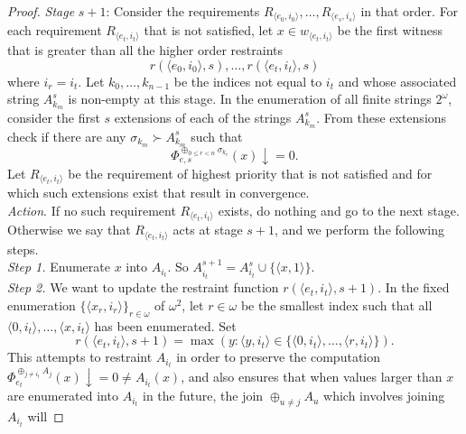 \documentclass{article}
\begin{document}
\begin{enumerate}[label={(\roman*)}]
\begin{proof}
        \textit{Stage} $s+1$: Consider the requirements $R_{\langle
        e_0,i_0\rangle}, \ldots, R_{\langle e_s,i_s\rangle}$ in that order.
        For each requirement $R_{\langle e_t,i_t\rangle}$ that is not
        satisfied, let $x\in w_{\langle e_t,i_t\rangle}$ be the first
        witness that is greater than all the higher order restraints
        \[r(\langle e_0,i_0\rangle,s), \ldots, r(\langle
        e_{t},i_{t}\rangle,s)\] where $i_r=i_t$. Let $k_0,\ldots,k_{n-1}$
        be the indices not equal to $i_t$ and whose associated string
        $A_{k_m}^s$ is non-empty at this stage. In the enumeration of all
        finite strings $2^{\omega}$, consider the first $s$ extensions of
        each of the strings $A_{k_m}^s$. From these extensions check if
        there are any $\sigma_{k_m}\succ A_{k_m}^s$ such that
        \[\Phi_{e,s}^{\oplus_{0\leq r<n}\sigma_{k_r}}(x) \downarrow=0.\]
        Let $R_{\langle e_t,i_t\rangle}$ be the requirement of highest
        priority that is not satisfied and for which such extensions exist
        that result in convergence. \\

        \textit{Action}. If no such requirement $R_{\langle
        e_t,i_t\rangle}$ exists, do nothing and go to the next stage.
        Otherwise we say that $R_{\langle e_t,i_t\rangle}$ acts at stage
        $s+1$, and we perform the following steps. \\

        \textit{Step 1.} Enumerate $x$ into $A_{i_t}$. So
        $A_{i_t}^{s+1}=A_{i_t}^s\cup\{\langle x,1\rangle\}$. \\

        \textit{Step 2.} We want to update the restraint function
        $r(\langle e_t,i_t\rangle,s+1)$. In the fixed enumeration
        $\{\langle x_r,i_r\rangle\}_{r\in\omega}$ of $\omega^2$, let
        $r\in\omega$ be the smallest index such that all $\langle
        0,i_t\rangle, \ldots, \langle x,i_t\rangle$ has been enumerated.
        Set
        \[r(\langle e_t,i_t\rangle,s+1) =\max(y: \langle y,i_t\rangle
        \in\{\langle 0,i_t\rangle, \ldots, \langle r,i_t\rangle\}).\]
        This attempts to restraint $A_{i_t}$ in order to preserve the
        computation $\Phi^{\oplus_{j\neq i_t}A_j}_{e_t}(x) \downarrow
        =0\neq A_{i_t}(x)$, and also ensures that when values larger than
        $x$ are enumerated into $A_{i_t}$ in the future, the join 
        $\oplus_{u\neq j}A_u$ which involves joining $A_{i_t}$ will
      \end{proof}
  \end{enumerate}
\end{document}
